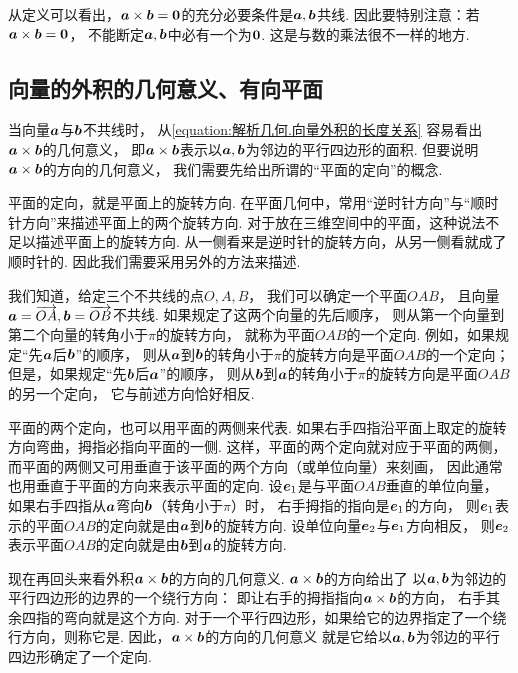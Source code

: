 从定义可以看出，\(\boldsymbol{a}\times\boldsymbol{b}=\boldsymbol{0}\)的充分必要条件是\(\boldsymbol{a},\boldsymbol{b}\)共线.
因此要特别注意：若\(\boldsymbol{a}\times\boldsymbol{b}=\boldsymbol{0}\)，
不能断定\(\boldsymbol{a},\boldsymbol{b}\)中必有一个为\(\boldsymbol{0}\).
这是与数的乘法很不一样的地方.

\subsection{向量的外积的几何意义、有向平面}
当向量\(\boldsymbol{a}\)与\(\boldsymbol{b}\)不共线时，
从\cref{equation:解析几何.向量外积的长度关系} 容易看出\(\boldsymbol{a}\times\boldsymbol{b}\)的几何意义，
即\(\boldsymbol{a}\times\boldsymbol{b}\)表示以\(\boldsymbol{a},\boldsymbol{b}\)为邻边的平行四边形的面积.
但要说明\(\boldsymbol{a}\times\boldsymbol{b}\)的方向的几何意义，
我们需要先给出所谓的“平面的定向”的概念.

平面的定向，就是平面上的旋转方向.
在平面几何中，常用“逆时针方向”与“顺时针方向”来描述平面上的两个旋转方向.
对于放在三维空间中的平面，这种说法不足以描述平面上的旋转方向.
从一侧看来是逆时针的旋转方向，从另一侧看就成了顺时针的.
因此我们需要采用另外的方法来描述.

我们知道，给定三个不共线的点\(O,A,B\)，
我们可以确定一个平面\(OAB\)，
且向量\(\boldsymbol{a}=\overrightarrow{OA},
\boldsymbol{b}=\overrightarrow{OB}\)不共线.
如果规定了这两个向量的先后顺序，
则从第一个向量到第二个向量的转角小于\(\pi\)的旋转方向，
就称为平面\(OAB\)的一个定向.
例如，如果规定“先\(\boldsymbol{a}\)后\(\boldsymbol{b}\)”的顺序，
则从\(\boldsymbol{a}\)到\(\boldsymbol{b}\)的转角小于\(\pi\)的旋转方向是平面\(OAB\)的一个定向；
但是，如果规定“先\(\boldsymbol{b}\)后\(\boldsymbol{a}\)”的顺序，
则从\(\boldsymbol{b}\)到\(\boldsymbol{a}\)的转角小于\(\pi\)的旋转方向是平面\(OAB\)的另一个定向，
它与前述方向恰好相反.

平面的两个定向，也可以用平面的两侧来代表.
如果右手四指沿平面上取定的旋转方向弯曲，拇指必指向平面的一侧.
这样，平面的两个定向就对应于平面的两侧，
而平面的两侧又可用垂直于该平面的两个方向（或单位向量）来刻画，
因此通常也用垂直于平面的方向来表示平面的定向.
设\(\boldsymbol{e}_1\)是与平面\(OAB\)垂直的单位向量，
如果右手四指从\(\boldsymbol{a}\)弯向\(\boldsymbol{b}\)（转角小于\(\pi\)）时，
右手拇指的指向是\(\boldsymbol{e}_1\)的方向，
则\(\boldsymbol{e}_1\)表示的平面\(OAB\)的定向就是由\(\boldsymbol{a}\)到\(\boldsymbol{b}\)的旋转方向.
设单位向量\(\boldsymbol{e}_2\)与\(\boldsymbol{e}_1\)方向相反，
则\(\boldsymbol{e}_2\)表示平面\(OAB\)的定向就是由\(\boldsymbol{b}\)到\(\boldsymbol{a}\)的旋转方向.

现在再回头来看外积\(\boldsymbol{a}\times\boldsymbol{b}\)的方向的几何意义.
\(\boldsymbol{a}\times\boldsymbol{b}\)的方向给出了
以\(\boldsymbol{a},\boldsymbol{b}\)为邻边的平行四边形的边界的一个绕行方向：
即让右手的拇指指向\(\boldsymbol{a}\times\boldsymbol{b}\)的方向，
右手其余四指的弯向就是这个方向.
对于一个平行四边形，如果给它的边界指定了一个绕行方向，则称它是.
因此，\(\boldsymbol{a}\times\boldsymbol{b}\)的方向的几何意义
就是它给以\(\boldsymbol{a},\boldsymbol{b}\)为邻边的平行四边形确定了一个定向.

